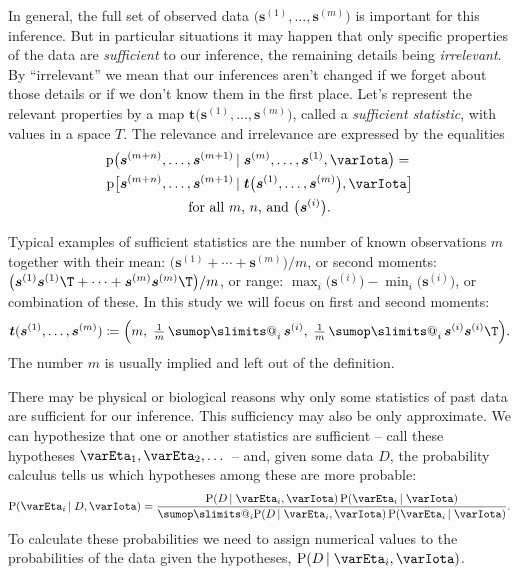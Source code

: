 \documentclass[\ifafour a4paper,12pt,\else a5paper,10pt,\fi%
onecolumn,oneside,article,%
british%
]{memoir}
\makeatletter
\theoremstyle{remark}
\theoremstyle{innote}
\def\sum{\DOTSI\sumop\slimits@}
\newcommand*{\defd}{\coloneqq}
\newcommand*{\pf}{\mathrm{p}}%
\newcommand*{\p}{\mathrm{P}}%
\renewcommand*{\|}{\nonscript\,\vert\nonscript\;\mathopen{}}
\newcommand*{\tsum}{\mathop{\textstyle\sum}\nolimits}
\newcommand*{\yI}{\varIota}
\newcommand*{\ys}{\bm{s}}
\newcommand*{\yt}{\bm{t}}
\newcommand*{\yso}[1]{\ys^{(#1)}}
\newcommand*{\yH}{\varEta}
\newcommand*{\yD}{D}
\makeatother
\begin{document}
In general, the full set of observed data
$\bigl(\yso{1}, \dotsc, \yso{m}\bigr)$ is important for this inference. But
in particular situations it may happen that only specific properties of the
data are \emph{sufficient} to our inference, the remaining details being
\emph{irrelevant}. By \enquote{irrelevant} we mean that our inferences
aren't changed if we forget about those details or if we don't know them in
the first place. Let's represent the relevant properties by a map
$\yt\bigl(\yso{1},\dotsc,\yso{m}\bigr)$, called a \emph{sufficient
  statistic}, with values in a space $T$. The relevance and irrelevance
are expressed by the equalities
\begin{multline}
  \label{eq:predictive_sufficiency}
  \pf\bigl(\yso{m+n}, \dotsc, \yso{m+1}
  \| \yso{m}, \dotsc, \yso{1}, \yI\bigr)
  ={}\\
  \pf\bigl[\yso{m+n}, \dotsc, \yso{m+1}
  \| \yt\bigl(\yso{1}, \dotsc, \yso{m}\bigr), \yI\bigr]
  \\
  \text{for all $m$, $n$, and $\bigl(\yso{i}\bigr)$.}
\end{multline}

Typical examples of sufficient statistics are the number of known
observations $m$ together with their mean:
$\bigl(\yso{1} + \dotsb + \yso{m}\bigr)/m$, or second moments:
$\bigl(\yso{1}{\yso{1}}\T + \dotsb + \yso{m}{\yso{m}}\T\bigl)/m$, or range:
$\max_i\bigl(\yso{i}\bigr)-\min_i\bigl(\yso{i}\bigr)$, or combination of
these. In this study we will focus on first and second moments:
\begin{equation}
  \label{eq:example_mean_suffstat}
  \yt(\yso{1}, \dotsc, \yso{m}) \defd
  \Bigl( m,\; \tfrac{1}{m}\tsum_i \yso{i}, \;
\tfrac{1}{m}\tsum_i\yso{i}{\yso{i}}\T
  \Bigr).
\end{equation}
The number $m$ is usually implied and left out of the definition.

There may be physical or biological reasons why only some statistics of
past data are sufficient for our inference. This sufficiency may also be
only approximate. We can hypothesize that one or another statistics are
sufficient -- call these hypotheses $\yH_1, \yH_2,\dotsc$ -- and, given
some data $\yD$, the probability calculus tells us which hypotheses among
these are more probable:
\begin{equation}
  \label{eq:example_mean_suffstat}
  \p(\yH_i \| \yD, \yI) =
  \frac{\p(\yD \| \yH_i, \yI)\, \p(\yH_i\|\yI)}{
    \sum_i\p(\yD \| \yH_i, \yI)\, \p(\yH_i\|\yI)
  }.
\end{equation}
To calculate these probabilities we need to assign numerical values to the
probabilities of the data given the hypotheses, $\p(\yD \| \yH_i, \yI)$.
\end{document}
